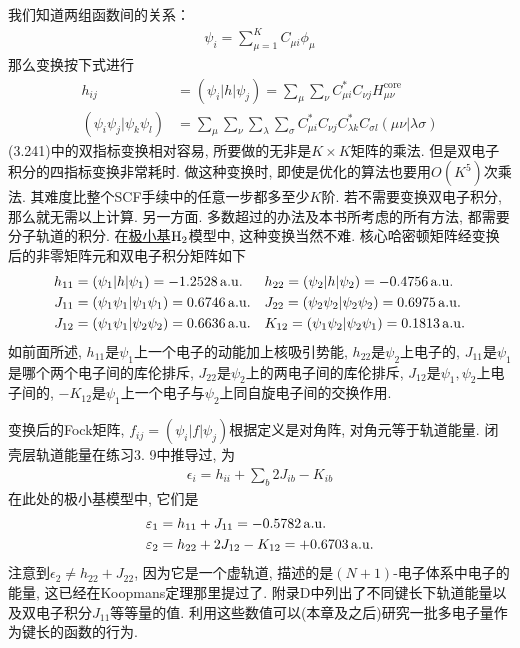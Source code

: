 我们知道两组函数间的关系：
\begin{align}
	\psi_i = \sum_{\mu=1}^{K}C_{\mu i}\phi_\mu
\end{align}
那么变换按下式进行
\begin{align}
	h_{ij} & = (\psi_i|h|\psi_j) = \sum_{\mu}\sum_{\nu}C_{\mu i}^*C_{\nu j}H_{\mu\nu}^\mathrm{core}\\
	(\psi_i\psi_j|\psi_k\psi_l) & = \sum_\mu\sum_\nu\sum_\lambda\sum_\sigma C_{\mu i}^*C_{\nu j}C_{\lambda k}^*C_{\sigma l}(\mu\nu|\lambda\sigma)
\end{align}
(3.241)中的双指标变换相对容易, 所要做的无非是$K\times K$矩阵的乘法. 
但是双电子积分的四指标变换非常耗时. 做这种变换时, 即使是优化的算法也要用$O(K^5)$次乘法. 其难度比整个SCF手续中的任意一步都多至少$K$阶. 
若不需要变换双电子积分, 那么就无需以上计算. 另一方面. 多数超过\hft 的办法及本书所考虑的所有方法, 都需要分子轨道的积分. 
在\underline{极小基$\mathrm{H}_2$}模型中, 这种变换当然不难. 
核心哈密顿矩阵经变换后的非零矩阵元和双电子积分矩阵如下
\begin{align*}
	h_{11} & =(\psi_1|h|\psi_1)=-1.2528\,\mathrm{a.u.}          &  & h_{22}=(\psi_2|h|\psi_2)=-0.4756\,\mathrm{a.u.}          \\
	J_{11} & =(\psi_1\psi_1|\psi_1\psi_1)=0.6746\,\mathrm{a.u.} &  & J_{22}=(\psi_2\psi_2|\psi_2\psi_2)=0.6975\,\mathrm{a.u.} \\
	J_{12} & =(\psi_1\psi_1|\psi_2\psi_2)=0.6636\,\mathrm{a.u.} &  & K_{12}=(\psi_1\psi_2|\psi_2\psi_1)=0.1813\,\mathrm{a.u.}
\end{align*}
如前面所述, 
$h_{11}$是$\psi_1$上一个电子的动能加上核吸引势能, 
$h_{22}$是$\psi_2$上电子的, 
$J_{11}$是$\psi_1$是哪个两个电子间的库伦排斥, 
$J_{22}$是$\psi_2$上的两电子间的库伦排斥, 
$J_{12}$是$\psi_1,\psi_2$上电子间的, 
$-K_{12}$是$\psi_1$上一个电子与$\psi_2$上同自旋电子间的交换作用.


变换后的Fock矩阵, 
$f_{ij}=(\psi_i|f|\psi_j)$根据定义是对角阵, 
对角元等于轨道能量. 
闭壳层轨道能量在练习3.
9中推导过, 
为
\begin{align}
	\epsilon_i = h_{ii} + \sum_b2J_{ib} -K_{ib}
\end{align}
在此处的极小基模型中, 
它们是
\begin{align}
	\varepsilon_1 & = h_{11} + J_{11} = -0.5782\,\mathrm{a.u.}\\
	\varepsilon_2 & = h_{22} + 2J_{12} - K_{12} = +0.6703\,\mathrm{a.u.}
\end{align}
注意到$\epsilon_2\neq h_{22}+J_{22}$, 
因为它是一个虚轨道, 
描述的是$(N+1)$-电子体系中电子的能量, 
这已经在Koopmans定理那里提过了. 
附录D中列出了不同键长下轨道能量以及双电子积分$J_{11}$等等量的值. 
利用这些数值可以(本章及之后)研究一批多电子量作为键长的函数的行为.


